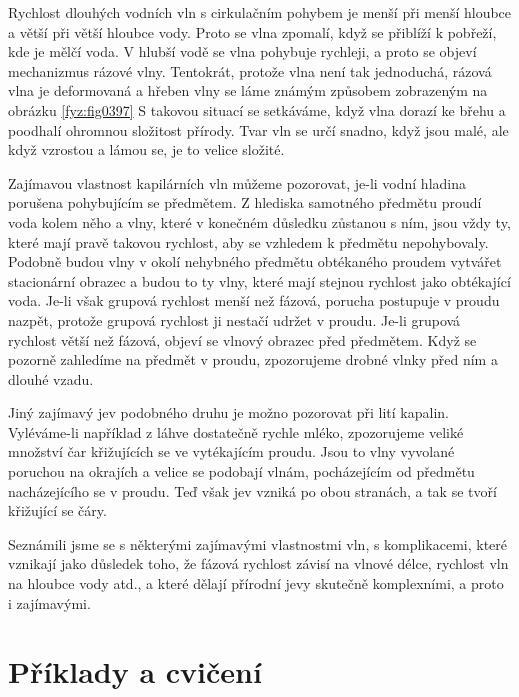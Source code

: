   Rychlost dlouhých vodních vln s cirkulačním pohybem je menší při menší hloubce a větší při větší 
  hloubce vody. Proto se vlna zpomalí, když se přiblíží k pobřeží, kde je mělčí voda. V hlubší vodě 
  se vlna pohybuje rychleji, a proto se objeví mechanizmus rázové vlny. Tentokrát, protože vlna 
  není tak jednoduchá, rázová vlna je deformovaná a hřeben vlny se láme známým způsobem zobrazeným 
  na obrázku \ref{fyz:fig0397} S takovou situací se setkáváme, když vlna dorazí ke břehu a poodhalí 
  ohromnou složitost přírody. Tvar vln se určí snadno, když jsou malé, ale když vzrostou a lámou 
  se, je to velice složité. 
  
  Zajímavou vlastnost kapilárních vln můžeme pozorovat, je-li vodní hladina porušena pohybujícím se 
  předmětem. Z hlediska samotného předmětu proudí voda kolem něho a vlny, které v konečném důsledku 
  zůstanou s ním, jsou vždy ty, které mají pravě takovou rychlost, aby se vzhledem k předmětu 
  nepohybovaly. Podobně budou vlny v okolí nehybného předmětu obtékaného proudem vytvářet 
  stacionární obrazec a budou to ty vlny, které mají stejnou rychlost jako obtékající voda. Je-li 
  však grupová rychlost menší než fázová, porucha postupuje v proudu nazpět, protože grupová 
  rychlost ji nestačí udržet v proudu. Je-li grupová rychlost větší než fázová, objeví se vlnový 
  obrazec před předmětem. Když se pozorně zahledíme na předmět v proudu, zpozorujeme drobné vlnky 
  před ním a dlouhé vzadu. 
  
  Jiný zajímavý jev podobného druhu je možno pozorovat při lití kapalin. Vyléváme-li například z 
  láhve dostatečně rychle mléko, zpozorujeme veliké množství čar křižujících se ve vytékajícím 
  proudu. Jsou to vlny vyvolané poruchou na okrajích a velice se podobají vlnám, pocházejícím od 
  předmětu nacházejícího se v proudu. Teď však jev vzniká po obou stranách, a tak se tvoří 
  křižující se čáry. 
  
  Seznámili jsme se s některými zajímavými vlastnostmi vln, s komplikacemi, které vznikají jako 
  důsledek toho, že fázová rychlost závisí na vlnové délce, rychlost vln na hloubce vody atd., a 
  které dělají přírodní jevy skutečně komplexními, a proto i zajímavými.
  
\section{Příklady a cvičení}\label{fyz:IchapLIsecVI}
  
  
